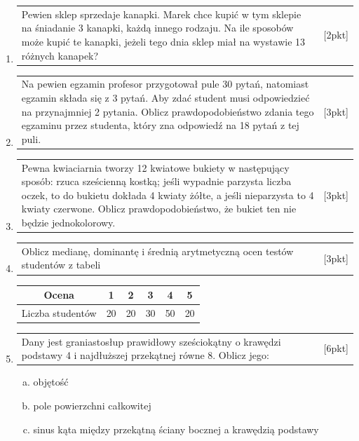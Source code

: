 \documentclass[12pt,a4paper]{article}
\begin{document}
\begin{enumerate}[1.]
		\item  \begin{tabular}{p{13cm} r}
			Pewien sklep sprzedaje kanapki. Marek chce kupić w tym sklepie na śniadanie 3 kanapki, każdą innego rodzaju. Na ile sposobów może kupić te kanapki, jeżeli tego dnia sklep miał na wystawie 13 różnych kanapek?&[2pkt]\\ 
		\end{tabular}
	
		\item  \begin{tabular}{p{13cm} r}
			Na pewien egzamin profesor przygotował pule 30 pytań, natomiast egzamin składa się z 3 pytań. Aby zdać student musi odpowiedzieć na przynajmniej 2 pytania. Oblicz prawdopodobieństwo zdania tego egzaminu przez studenta, który zna odpowiedź na 18 pytań z tej puli.&[3pkt]\\ 
		\end{tabular}
	
		\item  \begin{tabular}{p{13cm} r}
			Pewna kwiaciarnia tworzy 12 kwiatowe bukiety w następujący sposób: rzuca sześcienną kostką; jeśli wypadnie parzysta liczba oczek, to do bukietu dokłada 4 kwiaty żółte, a jeśli nieparzysta to 4 kwiaty czerwone. Oblicz prawdopodobieństwo, że bukiet ten nie będzie jednokolorowy.&[3pkt]\\ 
		\end{tabular}
	
		\item  \begin{tabular}{p{13cm} r}
			Oblicz medianę, dominantę i średnią arytmetyczną ocen testów studentów z tabeli &[3pkt]\\ 
		\end{tabular}
		
		\begin{tabular}{|c|c|c|c|c|c|}
			\hline
			Ocena&1&2&3&4&5\\
			\hline
			Liczba studentów&20&20&30&50&20\\
			\hline
		\end{tabular}
	
		\item  \begin{tabular}{p{13cm} r}
			Dany jest graniastosłup prawidłowy sześciokątny o krawędzi podstawy 4 i najdłuższej przekątnej równe 8. Oblicz jego:&[6pkt]\\ 
		\end{tabular}
		\begin{enumerate}[a)]
			\item objętość
			\item pole powierzchni całkowitej
			\item sinus kąta między przekątną ściany bocznej a krawędzią podstawy
		\end{enumerate}
	

\end{enumerate}
\end{document}
